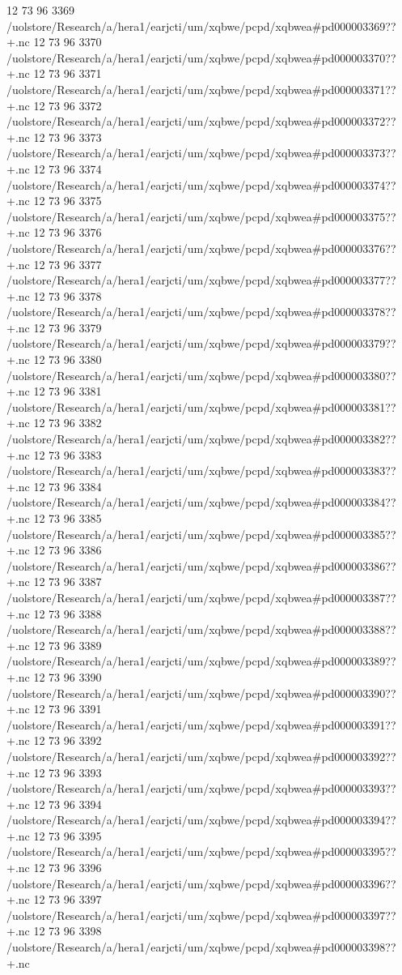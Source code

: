 12 73 96
3369
/uolstore/Research/a/hera1/earjcti/um/xqbwe/pcpd/xqbwea#pd000003369??+.nc
12 73 96
3370
/uolstore/Research/a/hera1/earjcti/um/xqbwe/pcpd/xqbwea#pd000003370??+.nc
12 73 96
3371
/uolstore/Research/a/hera1/earjcti/um/xqbwe/pcpd/xqbwea#pd000003371??+.nc
12 73 96
3372
/uolstore/Research/a/hera1/earjcti/um/xqbwe/pcpd/xqbwea#pd000003372??+.nc
12 73 96
3373
/uolstore/Research/a/hera1/earjcti/um/xqbwe/pcpd/xqbwea#pd000003373??+.nc
12 73 96
3374
/uolstore/Research/a/hera1/earjcti/um/xqbwe/pcpd/xqbwea#pd000003374??+.nc
12 73 96
3375
/uolstore/Research/a/hera1/earjcti/um/xqbwe/pcpd/xqbwea#pd000003375??+.nc
12 73 96
3376
/uolstore/Research/a/hera1/earjcti/um/xqbwe/pcpd/xqbwea#pd000003376??+.nc
12 73 96
3377
/uolstore/Research/a/hera1/earjcti/um/xqbwe/pcpd/xqbwea#pd000003377??+.nc
12 73 96
3378
/uolstore/Research/a/hera1/earjcti/um/xqbwe/pcpd/xqbwea#pd000003378??+.nc
12 73 96
3379
/uolstore/Research/a/hera1/earjcti/um/xqbwe/pcpd/xqbwea#pd000003379??+.nc
12 73 96
3380
/uolstore/Research/a/hera1/earjcti/um/xqbwe/pcpd/xqbwea#pd000003380??+.nc
12 73 96
3381
/uolstore/Research/a/hera1/earjcti/um/xqbwe/pcpd/xqbwea#pd000003381??+.nc
12 73 96
3382
/uolstore/Research/a/hera1/earjcti/um/xqbwe/pcpd/xqbwea#pd000003382??+.nc
12 73 96
3383
/uolstore/Research/a/hera1/earjcti/um/xqbwe/pcpd/xqbwea#pd000003383??+.nc
12 73 96
3384
/uolstore/Research/a/hera1/earjcti/um/xqbwe/pcpd/xqbwea#pd000003384??+.nc
12 73 96
3385
/uolstore/Research/a/hera1/earjcti/um/xqbwe/pcpd/xqbwea#pd000003385??+.nc
12 73 96
3386
/uolstore/Research/a/hera1/earjcti/um/xqbwe/pcpd/xqbwea#pd000003386??+.nc
12 73 96
3387
/uolstore/Research/a/hera1/earjcti/um/xqbwe/pcpd/xqbwea#pd000003387??+.nc
12 73 96
3388
/uolstore/Research/a/hera1/earjcti/um/xqbwe/pcpd/xqbwea#pd000003388??+.nc
12 73 96
3389
/uolstore/Research/a/hera1/earjcti/um/xqbwe/pcpd/xqbwea#pd000003389??+.nc
12 73 96
3390
/uolstore/Research/a/hera1/earjcti/um/xqbwe/pcpd/xqbwea#pd000003390??+.nc
12 73 96
3391
/uolstore/Research/a/hera1/earjcti/um/xqbwe/pcpd/xqbwea#pd000003391??+.nc
12 73 96
3392
/uolstore/Research/a/hera1/earjcti/um/xqbwe/pcpd/xqbwea#pd000003392??+.nc
12 73 96
3393
/uolstore/Research/a/hera1/earjcti/um/xqbwe/pcpd/xqbwea#pd000003393??+.nc
12 73 96
3394
/uolstore/Research/a/hera1/earjcti/um/xqbwe/pcpd/xqbwea#pd000003394??+.nc
12 73 96
3395
/uolstore/Research/a/hera1/earjcti/um/xqbwe/pcpd/xqbwea#pd000003395??+.nc
12 73 96
3396
/uolstore/Research/a/hera1/earjcti/um/xqbwe/pcpd/xqbwea#pd000003396??+.nc
12 73 96
3397
/uolstore/Research/a/hera1/earjcti/um/xqbwe/pcpd/xqbwea#pd000003397??+.nc
12 73 96
3398
/uolstore/Research/a/hera1/earjcti/um/xqbwe/pcpd/xqbwea#pd000003398??+.nc
